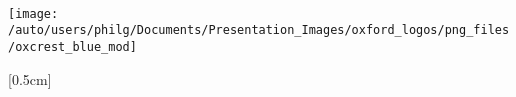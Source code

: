 \documentclass[../thesis-main.tex]{subfiles}
\begin{document}
 \begin{titlepage}
  \begin{center}
   \Huge
   {\bf \xtitle}\\
   \vspace*{1.5cm}
   {\Large \bf
    \xauthor\\
    \xcollege\\
   }
   \vspace*{2.5cm}
   \centerline
   {
    \texttt{[image: /auto/users/philg/Documents/Presentation\_Images/oxford\_logos/png\_files/oxcrest\_blue\_mod]}
   }
   \vspace*{1.5cm}
   \normalsize
   
   [0.5cm]
   {\bf \xterm}\\
   
   \vfill
   
  \end{center}
 \end{titlepage}
\end{document}
